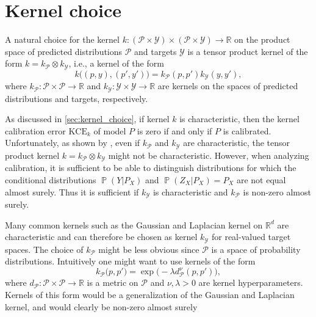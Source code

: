 \documentclass{article}
\DeclareMathOperator{\Prob}{\mathbb{P}}
\begin{document}
\section{Kernel choice}
\label{app:kernel}

A natural choice for the kernel
$k \colon (\mathcal{P} \times \mathcal{Y}) \times (\mathcal{P} \times \mathcal{Y}) \to \mathbb{R}$
on the product space of predicted distributions $\mathcal{P}$ and targets
$\mathcal{Y}$ is a tensor product kernel of the form $k = k_{\mathcal{P}} \otimes k_{\mathcal{Y}}$, i.e.,
a kernel of the form
\begin{equation*}
    k\big((p, y), (p', y')\big) = k_{\mathcal{P}}(p, p') k_{\mathcal{Y}}(y, y'),
\end{equation*}
where $k_{\mathcal{P}}\colon \mathcal{P} \times \mathcal{P} \to \mathbb{R}$ and
$k_{\mathcal{Y}} \colon \mathcal{Y} \times \mathcal{Y} \to \mathbb{R}$ are kernels
on the spaces of predicted distributions and targets, respectively.

As discussed in \cref{sec:kernel_choice}, if kernel $k$ is characteristic,
then the kernel calibration error $\mathrm{KCE}_k$ of model $P$ is zero
if and only if $P$ is calibrated. Unfortunately, as shown by
\citet[Example~1]{Szabo2018}, even if $k_{\mathcal{P}}$ and $k_{\mathcal{Y}}$ are characteristic,
the tensor product kernel $k = k_{\mathcal{P}} \otimes k_{\mathcal{Y}}$ might not be characteristic.
However, when analyzing calibration, it is sufficient to be able to
distinguish distributions for which the conditional distributions $\Prob(Y|P_X)$
and $\Prob(Z_X|P_X) = P_X$ are not equal almost surely. Thus it is sufficient
if $k_{\mathcal{Y}}$ is characteristic and $k_{\mathcal{P}}$ is non-zero almost surely.

Many common kernels such as the Gaussian and Laplacian kernel on
$\mathbb{R}^d$ are characteristic and can therefore be chosen as kernel
$k_{\mathcal{Y}}$ for real-valued target spaces. The choice of $k_{\mathcal{P}}$ might be less obvious
since $\mathcal{P}$ is a space of probability distributions. Intuitively
one might want to use kernels of the form
\begin{equation}\label{eq:kernelform}
    k_{\mathcal{P}}\big(p, p'\big) = \exp{\big(- \lambda d^\nu_{\mathcal{P}}(p, p')\big)},
\end{equation}
where $d_{\mathcal{P}} \colon \mathcal{P} \times \mathcal{P} \to \mathbb{R}$ is a
metric on $\mathcal{P}$ and $\nu, \lambda > 0$ are kernel hyperparameters.
Kernels of this form would be a generalization of the Gaussian and Laplacian
kernel, and would clearly be non-zero almost surely
\end{document}
